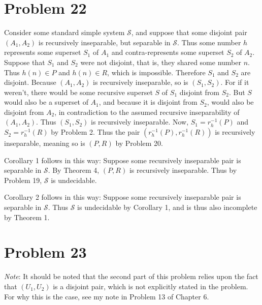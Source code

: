 \documentclass{article}
\theoremstyle{definition}
\begin{document}
\section*{Problem 22}
Consider some standard simple system $\mathcal{S}$, and suppose that some disjoint pair $(A_1,A_2)$ is recursively inseparable, but separable in $\mathcal{S}$. Thus some number $h$ represents 
some superset $S_1$ of $A_1$ and contra-represents some superset $S_2$ of $A_2$. Suppose that $S_1$ and $S_2$ were not disjoint, that is, they shared some number $n$. Thus $h(n)\in P$ and 
$h(n)\in R$, which is impossible. Therefore $S_1$ and $S_2$ are disjoint. Because $(A_1,A_2)$ is recursively inseparable, so is $(S_1,S_2)$. For if it weren't, there would be some recursive 
superset $S$ of $S_1$ disjoint from $S_2$. But $S$ would also be a superset of $A_1$, and because it is disjoint from $S_2$, would also be disjoint from $A_2$, in contradiction to the assumed 
recursive inseparability of $(A_1,A_2)$. Thus $(S_1,S_2)$ is recursively inseparable. Now, 
$S_1=r_h^{-1}(P)$ and $S_2=r_h^{-1}(R)$ by Problem 2. Thus the pair $(r_h^{-1}(P),r_h^{-1}(R))$ is recursively inseparable, meaning so is $(P,R)$ by Problem 20.


Corollary 1 follows in this way: Suppose some recursively inseparable pair is separable in $\mathcal{S}$. By Theorem 4, $(P,R)$ is recursively inseparable. Thus by Problem 19, $\mathcal{S}$ 
is undecidable. 


Corollary 2 follows in this way: Suppose some recursively inseparable pair is separable in $\mathcal{S}$. Thus $\mathcal{S}$ is undecidable by Corollary 1, and is thus also incomplete by 
Theorem 1.

\section*{Problem 23}
\textit{Note}: It should be noted that the second part of this problem relies upon the fact that $(U_1,U_2)$ is a disjoint pair, which is not explicitly stated in the problem. For why this is the case, see my 
note in Problem 13 of Chapter 6. 
\end{document}
